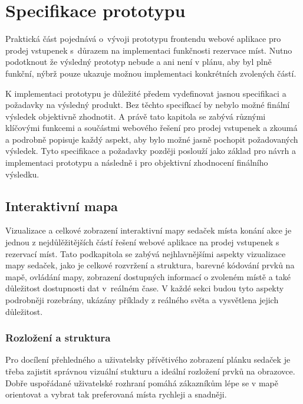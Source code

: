 \chapter{Specifikace prototypu}
\label{ch:specifikace}

Praktická část pojednává o~vývoji prototypu frontendu webové aplikace pro prodej vstupenek s~důrazem na implementaci funkčnosti rezervace míst.
Nutno podotknout že výsledný prototyp nebude a ani není v plánu, aby byl plně funkční, nýbrž pouze ukazuje možnou implementaci konkrétních zvolených částí.

K implementaci prototypu je důležité předem vydefinovat jasnou specifikaci a požadavky na výsledný produkt.
Bez těchto specifkací by nebylo možné finální výsledek objektivně zhodnotit.
A právě tato kapitola se zabývá různými klíčovými funkcemi a součástmi webového řešení pro prodej vstupenek a zkoumá a podrobně popisuje každý aspekt, aby bylo možné jasně pochopit požadovaných výsledek.
Tyto specifikace a požadavky později poslouží jako základ pro návrh a implementaci prototypu a následně i pro objektivní zhodnocení finálního výsledku.

\section{Interaktivní mapa}
\label{sec:specifikace-interaktivni-mapa}
Vizualizace a celkové zobrazení interaktivní mapy sedaček místa konání akce je jednou z nejdůlěžitějších částí řešení webové aplikace na prodej vstupenek s rezervací míst.
Tato podkapitola se zabývá nejhlavnějšími aspekty vizualizace mapy sedaček, jako je celkové rozvržení a struktura, barevné kódování prvků na mapě, ovládání mapy, zobrazení dostupných informací o zvoleném místě a také důležitost dostupnosti dat v~reálném čase.
V každé sekci budou tyto aspekty podrobněji rozebrány, ukázány příklady z reálného světa a vysvětlena jejich důležitost.

\subsection{Rozložení a struktura}
\label{subsec:specifikace-interaktivni-mapa-rozlozeni-a-struktura}
Pro docílení přehledného a uživatelsky přívětivého zobrazení plánku sedaček je třeba zajistit správnou vizuální stukturu a ideální rozložení prvků na obrazovce.
Dobře uspořádané uživatelské rozhraní pomáhá zákazníkům lépe se v mapě orientovat a vybrat tak preferovaná místa rychleji a snadněji.


